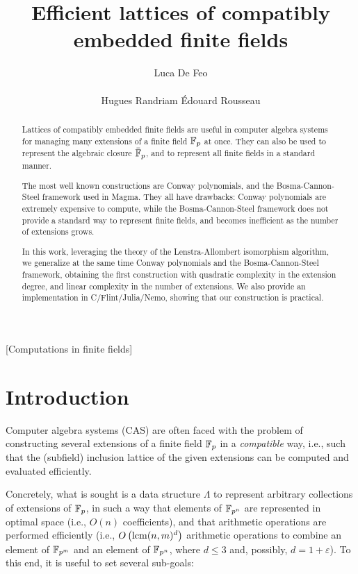 \documentclass{sig-alternate}
\author{
  \alignauthor Luca De Feo\\
  \affaddr{Universit\'e Paris Saclay -- UVSQ, LMV}\\
  \email{luca.de-feo@uvsq.fr}
  \alignauthor Hugues Randriam
  \alignauthor \'Edouard Rousseau
}
\title{Efficient lattices of compatibly embedded finite fields}
\begin{document}
\maketitle

\begin{abstract}
  Lattices of compatibly embedded finite fields are useful in computer
  algebra systems for managing many extensions of a finite field
  $\mathbb{F}_p$ at once. %
  They can also be used to represent the algebraic closure $\bar{\mathbb{F}}_p$,
  and to represent all finite fields in a standard manner.

  The most well known constructions are Conway polynomials, and the
  Bosma-Cannon-Steel framework used in Magma. %
  They all have drawbacks: Conway polynomials are extremely expensive
  to compute, while the Bosma-Cannon-Steel framework does not provide
  a standard way to represent finite fields, and becomes inefficient
  as the number of extensions grows.

  In this work, leveraging the theory of the Lenstra-Allombert
  isomorphism algorithm, we generalize at the same time Conway
  polynomials and the Bosma-Cannon-Steel framework, obtaining the
  first construction with quadratic complexity in the extension
  degree, and linear complexity in the number of extensions. %
  We also provide an implementation in C/Flint/Julia/Nemo, showing
  that our construction is practical.
\end{abstract}

[Computations in finite fields]

\section{Introduction}
\label{sec:introduction}

Computer algebra systems (CAS) are often faced with the problem of
constructing several extensions of a finite field $\mathbb{F}_p$ in a
\emph{compatible} way, i.e., such that the (subfield) inclusion
lattice of the given extensions can be computed and evaluated
efficiently.

Concretely, what is sought is a data structure $\Lambda$ to represent
arbitrary collections of extensions of $\mathbb{F}_{p}$, in such a way that
elements of $\mathbb{F}_{p^n}$ are represented in optimal space (i.e., $O(n)$
coefficients), and that arithmetic operations are performed
efficiently (i.e., $O\left(\operatorname{lcm}(n,m)^d\right)$ arithmetic operations
to combine an element of $\mathbb{F}_{p^m}$ and an element of $\mathbb{F}_{p^n}$,
where $d\le 3$ and, possibly, $d=1+\varepsilon$). %
To this end, it is useful to set several sub-goals:
\end{document}
